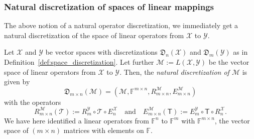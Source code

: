 \documentclass[a4paper]{paper}
\newcommand{\Discr}{\mathfrak{D}}
\newcommand{\VecSpace}[1]{\mathscr{#1}}
\newcommand{\Field}{\mathbb{F}}
\newcommand{\Op}[1]{\mathcal{#1}}
\newcommand{\DiscOp}[1]{\mathsf{#1}}
\newcommand*{\EXT}[2]{\ensuremath{E_{#1}^{#2}}}
\newcommand*{\REST}[2]{\ensuremath{R_{#1}^{#2}}}
\newcommand*{\RnX}{\ensuremath{\REST{n}{\VecSpace{X}}}}
\newcommand*{\RmY}{\ensuremath{\REST{m}{\VecSpace{Y}}}}
\newcommand*{\EnX}{\ensuremath{\EXT{n}{\VecSpace{X}}}}
\newcommand*{\EmY}{\ensuremath{\EXT{m}{\VecSpace{Y}}}}
\newcommand{\ip}[2]{\left \langle #1,#2 \right\rangle}
\newcommand{\ie}{\textsl{i.e.}\xspace}
\begin{document}
%


\subsubsection{Natural discretization of spaces of linear mappings}
The above notion of a natural operator discretization, we immediately get a natural discretization of the space of linear 
operators from $\VecSpace{X}$ to $\VecSpace{Y}$.

\begin{definition}
 \label{def:operator_space_discretization}
 Let $\VecSpace{X}$ and $\VecSpace{Y}$ be vector spaces with discretizations $\Discr_n(\VecSpace{X})$ and $\Discr_m(\VecSpace{Y})$ 
 as in Definition~\ref{def:space_discretization}. Let further $\VecSpace{M} := L(\VecSpace{X}, \VecSpace{Y})$ be the vector 
 space of linear operators from $\VecSpace{X}$ to $\VecSpace{Y}$. Then, the \emph{natural discretization of $\VecSpace{M}$} is given by
 \begin{equation*}
  \Discr_{m\times n}(\VecSpace{M}) = \left( \VecSpace{M}, \Field^{m\times n}, \REST{m\times n}{\VecSpace{M}}, \EXT{m\times n}{\VecSpace{M}}
  \right)
 \end{equation*}
 with the operators
\[  \REST{m\times n}{\VecSpace{M}}(\Op{T}) := \RmY \circ \Op{T} \circ \EnX
  \quad\text{and}\quad
  \EXT{m\times n}{\VecSpace{M}}(\DiscOp{T}) := \EmY \circ \DiscOp{T} \circ \RnX.
 \]
 We have here identified a linear operators from $\Field^n$ to $\Field^m$ with $\Field^{m\times n}$, the vector space of 
 $(m \times n)$ matrices with elements on $\Field$.
\end{definition}
\end{document}
